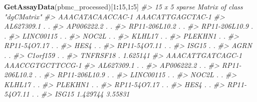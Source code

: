 \documentclass[
]{book}
\newenvironment{Shaded}{\begin{snugshade}}{\end{snugshade}}
\newcommand{\CommentTok}[1]{\textcolor[rgb]{0.56,0.35,0.01}{\textit{#1}}}
\newcommand{\DecValTok}[1]{\textcolor[rgb]{0.00,0.00,0.81}{#1}}
\newcommand{\FunctionTok}[1]{\textcolor[rgb]{0.13,0.29,0.53}{\textbf{#1}}}
\newcommand{\NormalTok}[1]{#1}
\newcommand{\SpecialCharTok}[1]{\textcolor[rgb]{0.81,0.36,0.00}{\textbf{#1}}}
\begin{document}
\begin{Shaded}
\begin{Highlighting}[]
\FunctionTok{GetAssayData}\NormalTok{(pbmc\_processed)[}\DecValTok{1}\SpecialCharTok{:}\DecValTok{15}\NormalTok{,}\DecValTok{1}\SpecialCharTok{:}\DecValTok{5}\NormalTok{]}
\CommentTok{\#\textgreater{} 15 x 5 sparse Matrix of class "dgCMatrix"}
\CommentTok{\#\textgreater{}               AAACATACAACCAC{-}1 AAACATTGAGCTAC{-}1}
\CommentTok{\#\textgreater{} AL627309.1                   .         .       }
\CommentTok{\#\textgreater{} AP006222.2                   .         .       }
\CommentTok{\#\textgreater{} RP11{-}206L10.2                .         .       }
\CommentTok{\#\textgreater{} RP11{-}206L10.9                .         .       }
\CommentTok{\#\textgreater{} LINC00115                    .         .       }
\CommentTok{\#\textgreater{} NOC2L                        .         .       }
\CommentTok{\#\textgreater{} KLHL17                       .         .       }
\CommentTok{\#\textgreater{} PLEKHN1                      .         .       }
\CommentTok{\#\textgreater{} RP11{-}54O7.17                 .         .       }
\CommentTok{\#\textgreater{} HES4                         .         .       }
\CommentTok{\#\textgreater{} RP11{-}54O7.11                 .         .       }
\CommentTok{\#\textgreater{} ISG15                        .         .       }
\CommentTok{\#\textgreater{} AGRN                         .         .       }
\CommentTok{\#\textgreater{} C1orf159                     .         .       }
\CommentTok{\#\textgreater{} TNFRSF18                     .         1.625141}
\CommentTok{\#\textgreater{}               AAACATTGATCAGC{-}1 AAACCGTGCTTCCG{-}1}
\CommentTok{\#\textgreater{} AL627309.1            .                 .      }
\CommentTok{\#\textgreater{} AP006222.2            .                 .      }
\CommentTok{\#\textgreater{} RP11{-}206L10.2         .                 .      }
\CommentTok{\#\textgreater{} RP11{-}206L10.9         .                 .      }
\CommentTok{\#\textgreater{} LINC00115             .                 .      }
\CommentTok{\#\textgreater{} NOC2L                 .                 .      }
\CommentTok{\#\textgreater{} KLHL17                .                 .      }
\CommentTok{\#\textgreater{} PLEKHN1               .                 .      }
\CommentTok{\#\textgreater{} RP11{-}54O7.17          .                 .      }
\CommentTok{\#\textgreater{} HES4                  .                 .      }
\CommentTok{\#\textgreater{} RP11{-}54O7.11          .                 .      }
\CommentTok{\#\textgreater{} ISG15                 1.429744          3.55831}

\end{Highlighting}
\end{Shaded}
\end{document}

